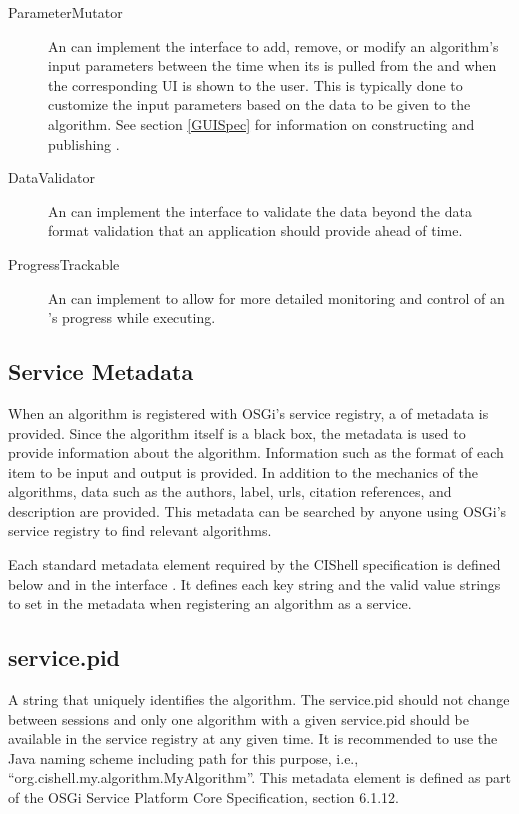 \begin{description}
  \item[ParameterMutator] An  can implement the
   interface to add, remove, or modify an algorithm's
  input parameters between the time when its  is pulled
  from the  and when the corresponding UI is shown to the
  user. This is typically done to customize the input parameters based on the
  data to be given to the algorithm. See section \ref{GUISpec} for information
  on constructing and publishing .
  
  \item[DataValidator] An  can implement the
   interface to validate the data beyond the data format
  validation that an application should provide ahead of time.

  \item[ProgressTrackable] An  can implement
   to allow for more detailed monitoring and control
  of an 's progress while executing.
\end{description}

\subsection{Service Metadata}
\label{algMetaData}

When an algorithm is registered with OSGi's service registry, a
 of metadata is provided. Since the algorithm itself is a black
box, the metadata is used to provide information about the algorithm. Information
such as the format of each  item to be input and output is provided.
In addition to the mechanics of the algorithms, data such as the authors, label,
urls, citation references, and description are provided. This metadata can be
searched by anyone using OSGi's service registry to find relevant algorithms.

Each standard metadata element required by the CIShell specification is defined
below and in the interface . It defines each key string
and the valid value strings to set in the metadata  when
registering an algorithm as a service.

\subsection*{service.pid}
A string that uniquely identifies the algorithm. The service.pid should not
change between sessions and only one algorithm with a given service.pid should
be available in the service registry at any given time. It is recommended to 
use the Java naming scheme including path for this purpose, i.e.,
``org.cishell.my.algorithm.MyAlgorithm''. This metadata element is defined
as part of the OSGi Service Platform Core Specification, section 6.1.12. 


